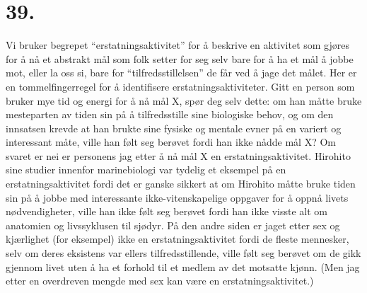 \documentclass[oneside]{book}
\begin{document}
\section*{39.}
Vi bruker begrepet ``erstatningsaktivitet'' for å beskrive en aktivitet som
gjøres for å nå et abstrakt mål som folk setter for seg selv bare for å ha et
mål å jobbe mot, eller la oss si, bare for ``tilfredsstillelsen'' de får ved å
jage det målet. Her er en tommelfingerregel for å identifisere 
erstatningsaktiviteter. Gitt en person som bruker mye tid og 
energi for å nå mål X, spør deg selv dette: om han måtte 
bruke mesteparten av tiden sin på å tilfredsstille sine biologiske behov, 
og om den innsatsen krevde at han brukte sine fysiske og mentale evner 
på en variert og interessant måte, ville han følt seg berøvet fordi 
han ikke nådde mål X? Om svaret er nei er personens jag etter å nå 
mål X en erstatningsaktivitet. Hirohito sine studier innenfor 
marinebiologi var tydelig et eksempel på en erstatningsaktivitet 
fordi det er ganske sikkert at om Hirohito måtte bruke tiden sin 
på å jobbe med interessante ikke-vitenskapelige oppgaver for å oppnå 
livets nødvendigheter, ville han ikke følt seg berøvet fordi han ikke 
visste alt om anatomien og livssyklusen til sjødyr. På den andre siden 
er jaget etter sex og kjærlighet (for eksempel) ikke en erstatningsaktivitet 
fordi de fleste mennesker, selv om deres eksistens var ellers tilfredsstillende, 
ville følt seg berøvet om de gikk gjennom livet uten å ha et forhold til et 
medlem av det motsatte kjønn. (Men jag etter en overdreven mengde med sex kan 
være en erstatningsaktivitet.)
\end{document}
